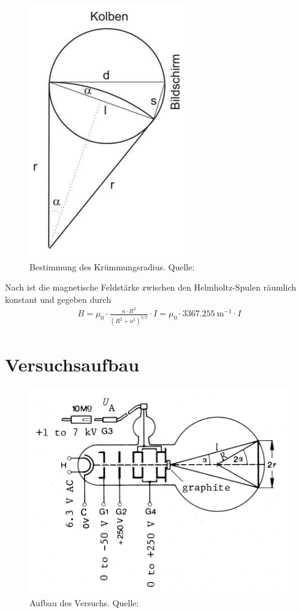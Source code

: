 \documentclass{article}
\begin{document}
\begin{figure}[H]
\includegraphics[scale=1.79]{radius.png}
\caption{Bestimmung des Krümmungsradius. Quelle: \cite{moodle}}
\label{fig:radius}

\end{figure}

Nach \cite{moodle} ist die magnetische Feldstärke zwischen den Helmholtz-Spulen räumlich konstant und gegeben durch
\begin{align}
B = \mu_0 \cdot \frac{n\cdot R^2}{(R^2+a^2)^{3/2}}\cdot I = \mu_0 \cdot 3367.255~\text{m}^{-1}\cdot I
\label{eq:Bfeld}
\end{align}

\section{Versuchsaufbau}

\begin{figure}[H]
\includegraphics[scale=1.79]{versuchsaufbau.png}
\caption{Aufbau des Versuchs. Quelle: \cite{moodle}}
\label{fig:aufbau}

\end{figure}
\end{document}
